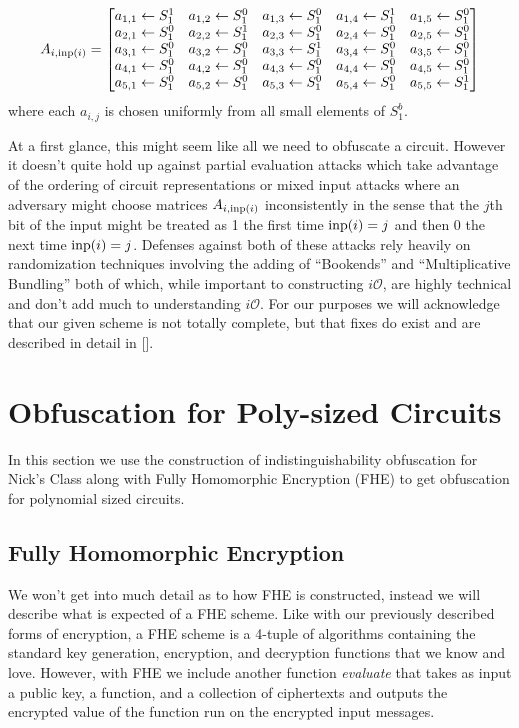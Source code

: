 \documentclass[12pt,twoside]{reedthesis}
\begin{document}
    
    $$
    A_{i,\text{inp}(i)} = 
    \begin{bmatrix}
    a_{1,1} \leftarrow S_1^{1} & a_{1,2}\leftarrow S_1^{0} & a_{1,3}\leftarrow S_1^{0} & a_{1,4}\leftarrow S_1^{1} & a_{1,5}\leftarrow S_1^{0}\\
    a_{2,1} \leftarrow S_1^{0} & a_{2,2}\leftarrow S_1^{1} & a_{2,3} \leftarrow S_1^{0} & a_{2,4} \leftarrow S_1^{0} &a_{2,5}\leftarrow S_1^{0}\\
    a_{3,1} \leftarrow S_1^{0}  &a_{3,2}\leftarrow S_1^{0}  &a_{3,3}\leftarrow S_1^{1} &a_{3,4}\leftarrow S_1^{0}  &a_{3,5}\leftarrow S_1^{0} \\
    a_{4,1}\leftarrow S_1^{0} &a_{4,2}\leftarrow S_1^{0} &a_{4,3}\leftarrow S_1^{0} &a_{4,4}\leftarrow S_1^{0} &a_{4,5}\leftarrow S_1^{0}\\
    a_{5,1}\leftarrow S_1^{0} &a_{5,2}\leftarrow S_1^{0} &a_{5,3}\leftarrow S_1^{0} &a_{5,4}\leftarrow S_1^{0} &a_{5,5}\leftarrow S_1^{1}\\
    \end{bmatrix}
    $$
    where each $a_{i,j}$ is chosen uniformly from all small elements of $S_1^{b}$.
    \par At a first glance, this might seem like all we need to obfuscate a circuit. However it doesn't quite hold up against partial evaluation attacks which take advantage of the ordering of circuit representations or mixed input attacks where an adversary might choose matrices $A_{i,\text{inp}(i)}$ inconsistently in the sense that the $j$th bit of the input might be treated as 1 the first time $\text{inp}(i)=j$ and then 0 the next time $\text{inp}(i) = j$. Defenses against both of these attacks rely heavily on randomization techniques involving the adding of ``Bookends'' and ``Multiplicative Bundling'' both of which, while important to constructing $i\mathcal{O}$, are highly technical and don't add much to understanding $i\mathcal{O}$. For our purposes we will acknowledge that our given scheme is not totally complete, but that fixes do exist and are described in detail in [\cite{Garg:2013}].
    
    
   
     
   
    
    \section{Obfuscation for Poly-sized Circuits}
    In this section we use the construction of indistinguishability obfuscation for Nick's Class along with Fully Homomorphic Encryption (FHE) to get obfuscation for polynomial sized circuits. 
    
    \subsection{Fully Homomorphic Encryption}
    We won't get into much detail as to how FHE is constructed, instead we will describe what is expected of a FHE scheme. Like with our previously described forms of encryption, a FHE scheme is a 4-tuple of algorithms containing the standard key generation, encryption, and decryption functions that we know and love. However, with FHE we include another function \textit{evaluate} that takes as input a public key, a function, and a collection of ciphertexts and outputs the encrypted value of the function run on the encrypted input messages. 
    
\end{document}
